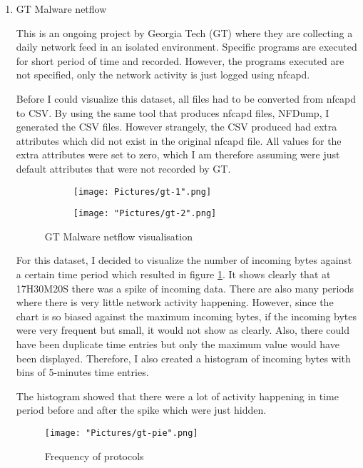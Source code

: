 \documentclass[11pt]{article}
\begin{document}
\begin{enumerate}
  \item{GT Malware netflow}

  This is an ongoing project by Georgia Tech (GT) \cite{bg-dataset-gt} where they are collecting a daily network feed in an isolated environment. Specific programs are executed for short period of time and recorded. However, the programs executed are not specified, only the network activity is just logged using nfcapd. 

  Before I could visualize this dataset, all files had to be converted from nfcapd to CSV. By using the same tool that produces nfcapd files, NFDump, I generated the CSV files. However strangely, the CSV produced had extra attributes which did not exist in the original nfcapd file. All values for the extra attributes were set to zero, which I am therefore assuming were just default attributes that were not recorded by GT.

\begin{figure}[h!]
    \centering
    \begin{subfigure}{\linewidth}
      \texttt{[image: Pictures/gt-1".png]}
    \end{subfigure}
    \begin{subfigure}{\linewidth}
      \texttt{[image: "Pictures/gt-2".png]}
    \end{subfigure}
    \caption{GT Malware netflow visualisation}
    \label{fig:gt-graph}
\end{figure}

  For this dataset, I decided to visualize the number of incoming bytes against a certain time period which resulted in figure \ref{fig:gt-graph}. It shows clearly that at 17H30M20S there was a spike of incoming data. There are also many periods where there is very little network activity happening. However, since the chart is so biased against the maximum incoming bytes, if the incoming bytes were very frequent but small, it would not show as clearly. Also, there could have been duplicate time entries but only the maximum value would have been displayed. Therefore, I also created a histogram of incoming bytes with bins of 5-minutes time entries.

  The histogram showed that there were a lot of activity happening in time period before and after the spike which were just hidden. 
 
\begin{figure}[h!]
   \texttt{[image: "Pictures/gt-pie".png]}
   \caption{Frequency of protocols}
   \label{fig:gt-pie}
\end{figure}


\end{enumerate}
\end{document}
